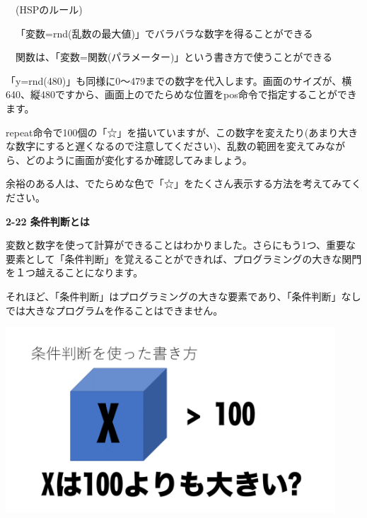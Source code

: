 \documentclass[a4paper,dvipdfmx]{jarticle}
\begin{document}
\bigskip


\bigskip


\bigskip


\bigskip


\bigskip


\bigskip


\bigskip


\bigskip


\bigskip


\bigskip


\bigskip


\bigskip

\ \ (HSPのルール)


\bigskip

\ \ 「変数=rnd(乱数の最大値)」でバラバラな数字を得ることができる

\ \ 関数は、「変数=関数(パラメーター)」という書き方で使うことができる


\bigskip

「y=rnd(480)」も同様に0〜479までの数字を代入します。画面のサイズが、横640、縦480ですから、画面上のでたらめな位置をpos命令で指定することができます。

repeat命令で100個の「☆」を描いていますが、この数字を変えたり(あまり大きな数字にすると遅くなるので注意してください)、乱数の範囲を変えてみながら、どのように画面が変化するか確認してみましょう。

余裕のある人は、でたらめな色で「☆」をたくさん表示する方法を考えてみてください。


\bigskip


\bigskip


\bigskip


\bigskip


\bigskip

{\bfseries
2-22 条件判断とは}


\bigskip

変数と数字を使って計算ができることはわかりました。さらにもう1つ、重要な要素として「条件判断」を覚えることができれば、プログラミングの大きな関門を１つ越えることになります。

それほど、「条件判断」はプログラミングの大きな要素であり、「条件判断」なしでは大きなプログラムを作ることはできません。



\begin{center}
\includegraphics[width=12.33cm,height=6.939cm]{text02-img/text02-img049.png}

\end{center}
\end{document}
